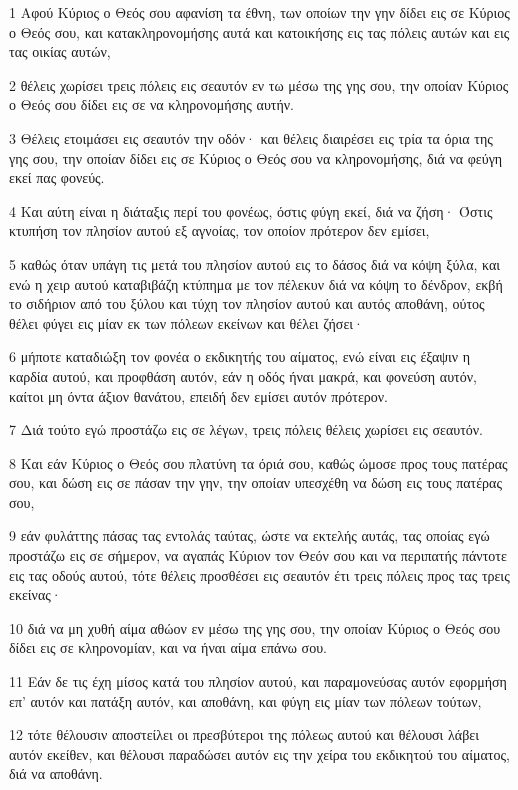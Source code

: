 \par 1 Αφού Κύριος ο Θεός σου αφανίση τα έθνη, των οποίων την γην δίδει εις σε Κύριος ο Θεός σου, και κατακληρονομήσης αυτά και κατοικήσης εις τας πόλεις αυτών και εις τας οικίας αυτών,
\par 2 θέλεις χωρίσει τρεις πόλεις εις σεαυτόν εν τω μέσω της γης σου, την οποίαν Κύριος ο Θεός σου δίδει εις σε να κληρονομήσης αυτήν.
\par 3 Θέλεις ετοιμάσει εις σεαυτόν την οδόν· και θέλεις διαιρέσει εις τρία τα όρια της γης σου, την οποίαν δίδει εις σε Κύριος ο Θεός σου να κληρονομήσης, διά να φεύγη εκεί πας φονεύς.
\par 4 Και αύτη είναι η διάταξις περί του φονέως, όστις φύγη εκεί, διά να ζήση· Όστις κτυπήση τον πλησίον αυτού εξ αγνοίας, τον οποίον πρότερον δεν εμίσει,
\par 5 καθώς όταν υπάγη τις μετά του πλησίον αυτού εις το δάσος διά να κόψη ξύλα, και ενώ η χειρ αυτού καταβιβάζη κτύπημα με τον πέλεκυν διά να κόψη το δένδρον, εκβή το σιδήριον από του ξύλου και τύχη τον πλησίον αυτού και αυτός αποθάνη, ούτος θέλει φύγει εις μίαν εκ των πόλεων εκείνων και θέλει ζήσει·
\par 6 μήποτε καταδιώξη τον φονέα ο εκδικητής του αίματος, ενώ είναι εις έξαψιν η καρδία αυτού, και προφθάση αυτόν, εάν η οδός ήναι μακρά, και φονεύση αυτόν, καίτοι μη όντα άξιον θανάτου, επειδή δεν εμίσει αυτόν πρότερον.
\par 7 Διά τούτο εγώ προστάζω εις σε λέγων, τρεις πόλεις θέλεις χωρίσει εις σεαυτόν.
\par 8 Και εάν Κύριος ο Θεός σου πλατύνη τα όριά σου, καθώς ώμοσε προς τους πατέρας σου, και δώση εις σε πάσαν την γην, την οποίαν υπεσχέθη να δώση εις τους πατέρας σου,
\par 9 εάν φυλάττης πάσας τας εντολάς ταύτας, ώστε να εκτελής αυτάς, τας οποίας εγώ προστάζω εις σε σήμερον, να αγαπάς Κύριον τον Θεόν σου και να περιπατής πάντοτε εις τας οδούς αυτού, τότε θέλεις προσθέσει εις σεαυτόν έτι τρεις πόλεις προς τας τρεις εκείνας·
\par 10 διά να μη χυθή αίμα αθώον εν μέσω της γης σου, την οποίαν Κύριος ο Θεός σου δίδει εις σε κληρονομίαν, και να ήναι αίμα επάνω σου.
\par 11 Εάν δε τις έχη μίσος κατά του πλησίον αυτού, και παραμονεύσας αυτόν εφορμήση επ' αυτόν και πατάξη αυτόν, και αποθάνη, και φύγη εις μίαν των πόλεων τούτων,
\par 12 τότε θέλουσιν αποστείλει οι πρεσβύτεροι της πόλεως αυτού και θέλουσι λάβει αυτόν εκείθεν, και θέλουσι παραδώσει αυτόν εις την χείρα του εκδικητού του αίματος, διά να αποθάνη.
